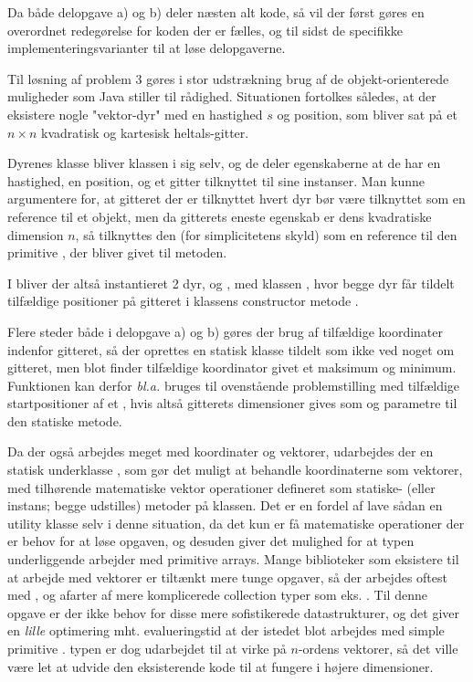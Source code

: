 Da både delopgave a) og b) deler næsten alt kode, så vil der først gøres en overordnet redegørelse for koden der er fælles, og til sidst de specifikke implementeringsvarianter til at løse delopgaverne.

Til løsning af problem 3 gøres i stor udstrækning brug af de objekt-orienterede muligheder som Java stiller til rådighed. Situationen fortolkes således, at der eksistere nogle "vektor-dyr" med en hastighed \(s\) og position, som bliver sat på et \(n \times n\) kvadratisk og kartesisk heltals-gitter.

Dyrenes klasse bliver  klassen i sig selv, og de deler egenskaberne at de har en hastighed, en position, og et gitter tilknyttet til sine instanser. Man kunne argumentere for, at gitteret der er tilknyttet hvert dyr bør være tilknyttet som en reference til et objekt, men da gitterets eneste egenskab er dens kvadratiske dimension \(n\), så tilknyttes den (for simplicitetens skyld) som en reference til den primitive , der bliver givet til  metoden.

I  bliver der altså instantieret 2 dyr,  og , med klassen , hvor begge dyr får tildelt tilfældige positioner på gitteret i klassens constructor metode .

Flere steder både i delopgave a) og b) gøres der brug af tilfældige koordinater indenfor gitteret, så der oprettes en statisk klasse tildelt  som ikke ved noget om gitteret, men blot finder tilfældige koordinator givet et maksimum og minimum. Funktionen  kan derfor \textit{bl.a.} bruges til ovenstående problemstilling med tilfældige startpositioner af et , hvis altså gitterets dimensioner gives som  og  parametre til den statiske metode.

Da der også arbejdes meget med koordinater og vektorer, udarbejdes der en statisk underklasse , som gør det muligt at behandle koordinaterne som vektorer, med tilhørende matematiske vektor operationer defineret som statiske- (eller instans; begge udstilles) metoder på  klassen. Det er en fordel af lave sådan en utility klasse selv i denne situation, da det kun er få matematiske operationer der er behov for at løse opgaven, og desuden giver det mulighed for at  typen underliggende arbejder med primitive  arrays. Mange biblioteker som eksistere til at arbejde med vektorer er tiltænkt mere tunge opgaver, så der arbejdes oftest med , og afarter af mere komplicerede collection typer som eks. . Til denne opgave er der ikke behov for disse mere sofistikerede datastrukturer, og det giver en \textit{lille} optimering mht. evalueringstid at der istedet blot arbejdes med simple primitive .  typen er dog udarbejdet til at virke på \(n\)-ordens vektorer, så det ville være let at udvide den eksisterende kode til at fungere i højere dimensioner.

